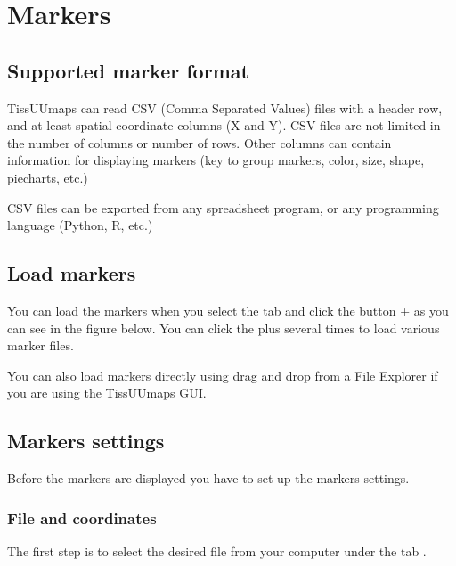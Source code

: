 \documentclass[letterpaper,10pt,english,openany,oneside]{sphinxmanual}
\begin{document}
\sphinxAtStartPar
{}

\sphinxstepscope


\section{Markers}
\label{\detokenize{docs/starting/markers:markers}}\label{\detokenize{docs/starting/markers::doc}}

\subsection{Supported marker format}
\label{\detokenize{docs/starting/markers:supported-marker-format}}
\sphinxAtStartPar
TissUUmaps can read CSV (Comma Separated Values) files with a header row, and at least spatial coordinate columns (X and Y). CSV files are not limited in the number of columns or number of rows. Other columns can contain information for displaying markers (key to group markers, color, size, shape, piecharts, etc.)

\sphinxAtStartPar
CSV files can be exported from any spreadsheet program, or any programming language (Python, R, etc.)


\subsection{Load markers}
\label{\detokenize{docs/starting/markers:load-markers}}
\sphinxAtStartPar
You can load the markers when you select the  tab and click the button + as you can see in the figure below. You can click the plus several times to load various marker files.

\sphinxAtStartPar
You can also load markers directly using drag and drop from a File Explorer if you are using the TissUUmaps GUI.


\subsection{Markers settings}
\label{\detokenize{docs/starting/markers:markers-settings}}
\sphinxAtStartPar
Before the markers are displayed you have to set up the markers settings.


\subsubsection{File and coordinates}
\label{\detokenize{docs/starting/markers:file-and-coordinates}}
\sphinxAtStartPar
The first step is to select the desired file from your computer under the tab .
\end{document}
